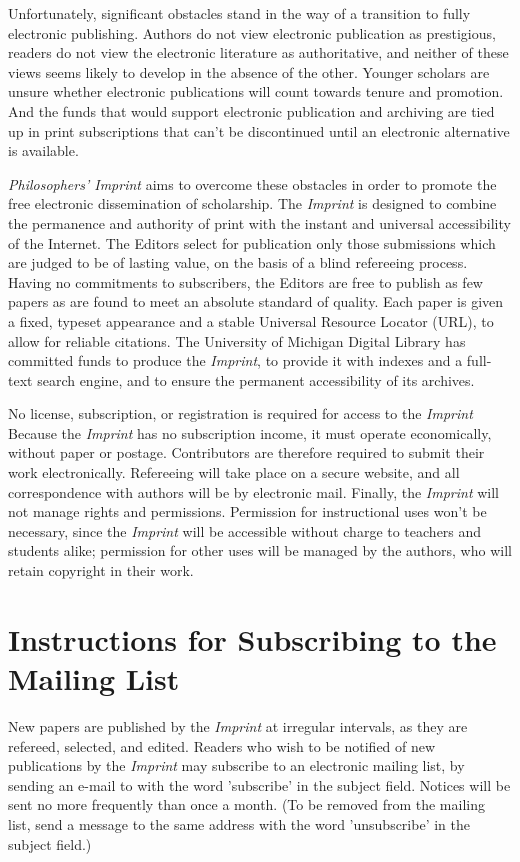 \documentclass[noflushend]{philosophersimprint}
\begin{document}
Unfortunately, significant obstacles stand in the way of a transition
to fully electronic publishing. Authors do not view electronic
publication as prestigious, readers do not view the electronic
literature as authoritative, and neither of these views seems likely
to develop in the absence of the other. Younger scholars are unsure
whether electronic publications will count towards tenure and
promotion. And the funds that would support electronic publication and
archiving are tied up in print subscriptions that can't be
discontinued until an electronic alternative is available.

\emph{Philosophers' Imprint} aims to overcome these obstacles in order
to promote the free electronic dissemination of scholarship. The
\emph{Imprint} is designed to combine the permanence and authority of
print with the instant and universal accessibility of the Internet.
The Editors select for publication only those submissions which are
judged to be of lasting value, on the basis of a blind refereeing
process. Having no commitments to subscribers, the Editors are free to
publish as few papers as are found to meet an absolute standard of
quality. Each paper is given a fixed, typeset appearance and a stable
Universal Resource Locator (URL), to allow for reliable citations. The
University of Michigan Digital Library has committed funds to produce
the \emph{Imprint}, to provide it with indexes and a full-text search
engine, and to ensure the permanent accessibility of its archives.

No license, subscription, or registration is required for access to
the \emph{Imprint} Because the \emph{Imprint} has no subscription
income, it must operate economically, without paper or postage.
Contributors are therefore required to submit their work
electronically. Refereeing will take place on a secure website, and
all correspondence with authors will be by electronic mail. Finally,
the \emph{Imprint} will not manage rights and permissions. Permission
for instructional uses won't be necessary, since the \emph{Imprint}
will be accessible without charge to teachers and students alike;
permission for other uses will be managed by the authors, who will
retain copyright in their work.


\section{Instructions for Subscribing to the Mailing List}

New papers are published by the \emph{Imprint} at irregular intervals,
as they are refereed, selected, and edited. Readers who wish to be
notified of new publications by the \emph{Imprint} may subscribe to an
electronic mailing list, by sending an e-mail to
 with the word
'subscribe' in the subject field. Notices will be sent no more
frequently than once a month. (To be removed from the mailing list,
send a message to the same address with the word 'unsubscribe' in the
subject field.)
\end{document}
